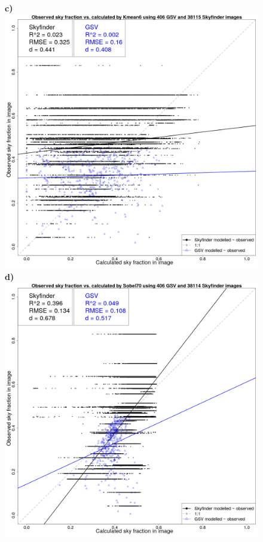 \documentclass[final,3p,times,authoryear]{elsarticle}
\begin{document}
\begin{figure}
\textbf{c)}\includegraphics[scale=0.15]{Images/ErrorPlotsCombinedIndivKmean6.png}
\textbf{d)}\includegraphics[scale=0.15]{Images/ErrorPlotsCombinedIndivSobel70.png}

\end{figure}
\end{document}
